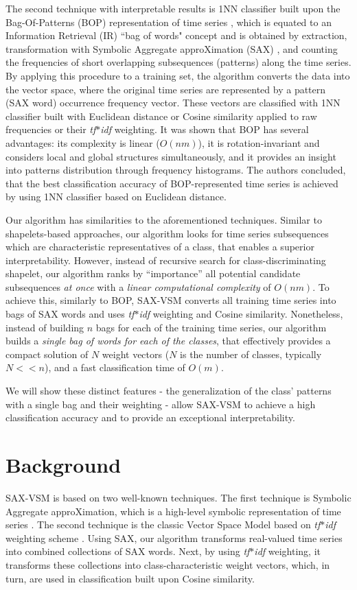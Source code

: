 \documentclass[conference]{IEEEtran}
\begin{document}
The second technique with interpretable results is 1NN classifier built upon the 
Bag-Of-Patterns (BOP) representation of time series \cite{bag_patterns}, 
which is equated to an Information Retrieval (IR) ``bag of words" concept 
and is obtained by extraction, transformation with Symbolic Aggregate 
approXimation (SAX) \cite{sax}, and counting the frequencies
of short overlapping subsequences (patterns) along the time series.
By applying this procedure to a training set, the algorithm converts the data into 
the vector space, where the original time series are represented by a 
pattern (SAX word) occurrence frequency vector. 
These vectors are classified with 1NN classifier built with Euclidean distance 
or Cosine similarity applied to raw frequencies or their \textit{tf$\ast$idf} weighting. 
It was shown that BOP has several advantages: its complexity is linear 
($O(nm)$), it is rotation-invariant and considers local and global structures 
simultaneously, and it provides an insight into patterns distribution through 
frequency histograms.
The authors concluded, that the best classification accuracy of BOP-represented 
time series is achieved by using 1NN classifier based on Euclidean distance.

Our algorithm has similarities to the aforementioned techniques. 
Similar to shapelets-based approaches, our algorithm looks for 
time series subsequences which are characteristic representatives 
of a class, that enables a superior interpretability.
However, instead of recursive search for class-discriminating shapelet, 
our algorithm ranks by “importance” all potential candidate subsequences 
\textit{at once} with a \textit{linear computational complexity} of $O(nm)$.
To achieve this, similarly to BOP, \mbox{SAX-VSM} converts all training 
time series into bags of SAX words and uses \textit{tf$\ast$idf} 
weighting and Cosine similarity.
Nonetheless, instead of building $n$ bags for each of the training time series, 
our algorithm builds a \textit{single bag of words for each of the classes}, 
that effectively provides a compact solution of $N$ weight vectors 
($N$ is the number of classes, typically $N<<n$), and a fast classification time 
of $O(m)$.

We will show these distinct features - the generalization of the class' 
patterns with a single bag and their weighting - allow SAX-VSM to achieve a 
high classification accuracy and to provide an exceptional interpretability.

\section{Background} \label{background}
SAX-VSM is based on two well-known techniques. The first technique is 
Symbolic Aggregate approXimation, which is a high-level symbolic
representation of time series \cite{sax}. 
The second technique is the classic Vector Space Model based on 
\textit{tf$\ast$idf} weighting scheme \cite{salton}. 
Using SAX, our algorithm transforms real-valued time series into combined 
collections of SAX words. Next, by using \textit{tf$\ast$idf} weighting, it 
transforms these collections into class-characteristic weight vectors, 
which, in turn, are used in classification built upon Cosine similarity.
\end{document}
